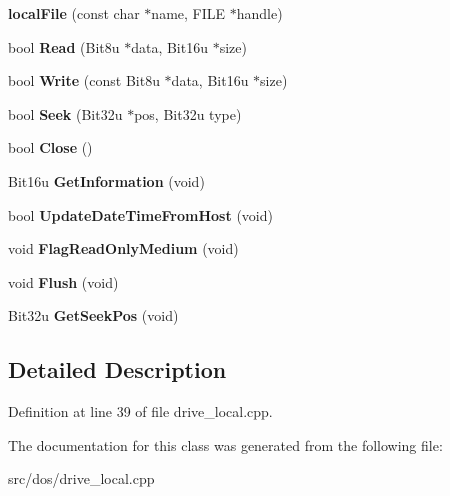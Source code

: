 \begin{DoxyCompactItemize}
\item 
\hypertarget{classlocalFile_ab28a6808847aceacff4d4405cb618bab}{{\bfseries local\-File} (const char $\ast$name, F\-I\-L\-E $\ast$handle)}\label{classlocalFile_ab28a6808847aceacff4d4405cb618bab}

\item 
\hypertarget{classlocalFile_a558f7d758b8818237b26722c466f0f49}{bool {\bfseries Read} (Bit8u $\ast$data, Bit16u $\ast$size)}\label{classlocalFile_a558f7d758b8818237b26722c466f0f49}

\item 
\hypertarget{classlocalFile_a692068e0eb68eaa11661f2246270af1c}{bool {\bfseries Write} (const Bit8u $\ast$data, Bit16u $\ast$size)}\label{classlocalFile_a692068e0eb68eaa11661f2246270af1c}

\item 
\hypertarget{classlocalFile_ab661b8383ca8cf945056571ca982912a}{bool {\bfseries Seek} (Bit32u $\ast$pos, Bit32u type)}\label{classlocalFile_ab661b8383ca8cf945056571ca982912a}

\item 
\hypertarget{classlocalFile_a29a72ec4be5c9f3b0196f2f4d47f5f54}{bool {\bfseries Close} ()}\label{classlocalFile_a29a72ec4be5c9f3b0196f2f4d47f5f54}

\item 
\hypertarget{classlocalFile_a970064b86d4966929fae874542104cba}{Bit16u {\bfseries Get\-Information} (void)}\label{classlocalFile_a970064b86d4966929fae874542104cba}

\item 
\hypertarget{classlocalFile_a6ddb9040bcee2bfb3673228b47042e89}{bool {\bfseries Update\-Date\-Time\-From\-Host} (void)}\label{classlocalFile_a6ddb9040bcee2bfb3673228b47042e89}

\item 
\hypertarget{classlocalFile_a48ed18aa11972f7236cc34928387ff32}{void {\bfseries Flag\-Read\-Only\-Medium} (void)}\label{classlocalFile_a48ed18aa11972f7236cc34928387ff32}

\item 
\hypertarget{classlocalFile_a6fc67afa9e37a05b353d4376a714d495}{void {\bfseries Flush} (void)}\label{classlocalFile_a6fc67afa9e37a05b353d4376a714d495}

\item 
\hypertarget{classlocalFile_ac0b74c929048947e12d164a0430d32e2}{Bit32u {\bfseries Get\-Seek\-Pos} (void)}\label{classlocalFile_ac0b74c929048947e12d164a0430d32e2}

\end{DoxyCompactItemize}


\subsection{Detailed Description}


Definition at line 39 of file drive\-\_\-local.\-cpp.



The documentation for this class was generated from the following file\-:\begin{DoxyCompactItemize}
\item 
src/dos/drive\-\_\-local.\-cpp\end{DoxyCompactItemize}

